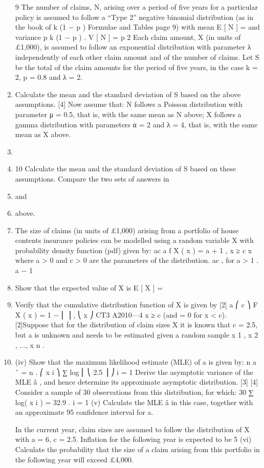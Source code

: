 \documentclass[a4paper,12pt]{article}
\begin{document}
\begin{enumerate}
9
The number of claims, N, arising over a period of five years for a particular policy is
assumed to follow a “Type 2” negative binomial distribution (as in the book of
k (1 − p )
Formulae and Tables page 9) with mean E [ N ] =
and variance
p
k (1 − p )
.
V [ N ] =
p 2
Each claim amount, X (in units of £1,000), is assumed to follow an exponential
distribution with parameter λ independently of each other claim amount and of the
number of claims.
Let S be the total of the claim amounts for the period of five years, in the case
k = 2, p = 0.8 and λ = 2.
\item 
Calculate the mean and the standard deviation of S based on the above
assumptions.
[4]
Now assume that:
N follows a Poisson distribution with parameter μ = 0.5, that is, with the same
mean as N above;
X follows a gamma distribution with parameters α = 2 and λ = 4, that is, with
the same mean as X above.
\item 
\item 
10
Calculate the mean and the standard deviation of S based on these
assumptions.
Compare the two sets of answers in \item  and \item  above.
\item The size of claims (in units of £1,000) arising from a portfolio of house contents
insurance policies can be modelled using a random variable X with probability density
function (pdf) given by:
ac a
f X ( x ) = a + 1 , x ≥ c
x
where a > 0 and c > 0 are the parameters of the distribution.
ac
, for a > 1 .
a − 1
\item  Show that the expected value of X is E [ X ] =
\item  Verify that the cumulative distribution function of X is given by
[2]
a
⎛ c ⎞
F X ( x ) = 1 − ⎜ ⎟ ,
⎝ x ⎠
CT3 A2010—4
x ≥ c
(and = 0 for x < c).
[2]Suppose that for the distribution of claim sizes X it is known that c = 2.5, but a is
unknown and needs to be estimated given a random sample x 1 , x 2 , ..., x n .
\item 
(iv)
Show that the maximum likelihood estimate (MLE) of a is given by:
n
a ˆ = n
.
⎛ x i ⎞
∑ log ⎜ ⎝ 2.5 ⎟ ⎠
i = 1
Derive the asymptotic variance of the MLE â , and hence determine its
approximate asymptotic distribution.
[3]
[4]
Consider a sample of 30 observations from this distribution, for which:
30
∑ log( x i ) = 32.9 .
i = 1
(v)
Calculate the MLE â in this case, together with an approximate 95%
confidence interval for a.

In the current year, claim sizes are assumed to follow the distribution of X with a = 6,
c = 2.5. Inflation for the following year is expected to be 5%
(vi)
Calculate the probability that the size of a claim arising from this portfolio in
the following year will exceed £4,000.
\end{enumerate}
\end{document}
